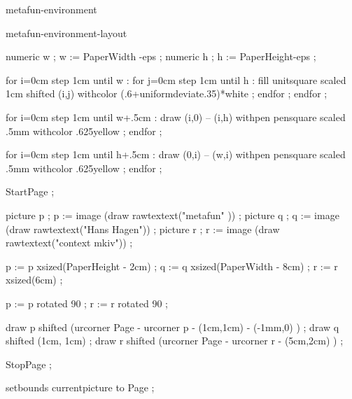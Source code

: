 
\startenvironment metafun-environment

\environment metafun-environment-layout



    numeric w ; w := PaperWidth -eps ; %
    numeric h ; h := PaperHeight-eps ; %

    for i=0cm step 1cm until w  :
        for j=0cm step 1cm until h :
            fill unitsquare scaled 1cm shifted (i,j) withcolor (.6+uniformdeviate.35)*white ;
        endfor ;
    endfor ;


    for i=0cm step 1cm until w+.5cm :
        draw (i,0) -- (i,h) withpen pensquare scaled .5mm withcolor .625yellow ;
    endfor ;

    for i=0cm step 1cm until h+.5cm :
        draw (0,i) -- (w,i) withpen pensquare scaled .5mm withcolor .625yellow ;
    endfor ;

\stopuseMPgraphic


    StartPage ;


        picture p ; p := image (draw rawtextext("\darkred{}metafun"   )) ;
        picture q ; q := image (draw rawtextext("\darkred{}Hans Hagen")) ;
        picture r ; r := image (draw rawtextext("\darkred{}context mkiv")) ;

        p := p xsized(PaperHeight - 2cm) ;
        q := q xsized(PaperWidth  - 8cm) ;
        r := r xsized(6cm) ;

        p := p rotated 90 ;
        r := r rotated 90 ;

        draw p shifted (urcorner Page - urcorner p - (1cm,1cm) - (-1mm,0) ) ;
        draw q shifted (1cm, 1cm) ;
        draw r shifted (urcorner Page - urcorner r - (5cm,2cm) ) ;

    StopPage ;

    setbounds currentpicture to Page ;

\stopuseMPgraphic


